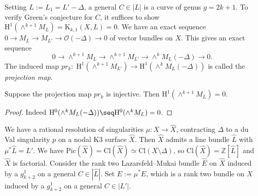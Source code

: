 Setting $L:=L_1=L'-\Delta$, a general $C \in |L|$ is a curve of genus $g=2k+1$. To verify Green's conjecture for $C$, it suffices to show $\mathrm{H}^1(\wedge^{k+1}M_L)=\mathrm{K}_{k,1}(X,L)=0$. We have an exact sequence $0 \to M_L \to M_{L'} \to \mathcal{O}(-\Delta) \to 0$
of vector bundles on $X$. This gives an exact sequence $$0 \to \wedge^{k+1}M_L \to \wedge^{k+1}M_{L'} \to \wedge^k M_L (-\Delta) \to 0.$$
The induced map $pr_{k}: \; \mathrm{H}^1(\wedge^{k+1}M_{L'}) \to \mathrm{H}^1(\wedge^k M_L (-\Delta))$ is called the \emph{projection map}.
\begin{lem}
\notready \label{proj-crit}
Suppose the projection map $pr_k$ is injective. Then $\mathrm{H}^1(\wedge^{k+1}M_L)=0$.
\end{lem}\begin{proof}
Indeed $\mathrm{H}^0(\wedge^k M_L (-\Delta))\seq \mathrm{H}^0(\wedge^k M_L)=0$. %
\end{proof}

 We have a rational resolution of singularities $\mu : X \to \hat{X}$, contracting $\Delta$ to a du Val singularity $p$ on a nodal K3 surface $\hat{X}$. Then $\hat{X}$ admits a line bundle $\hat{L}$ with $\mu^*{\hat{L}}=L'$. We have $\mathrm{Pic}(\hat{X})=\mathrm{Cl}(\hat{X})\simeq \mathrm{Cl}(X\setminus \Delta)$, so  $\mathrm{Cl}(\hat{X})=\mathbb{Z}[\hat{L}]$ and $\hat{X}$ is factorial. Consider the rank two Lazarsfeld--Mukai bundle $\hat{E}$ on $\hat{X}$ induced by a $g^1_{k+2}$ on a general $C \in |\hat{L}|$. Set $E:=\mu^*\hat{E}$, which is a rank two bundle on $X$ induced by a $g^1_{k+2}$ on a general $C \in |L'|$.

